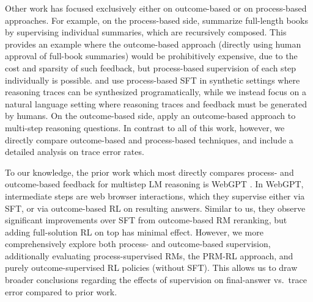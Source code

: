 \documentclass[11pt, a4paper, logo]{deepmind}
\newcommand{\prmrl}{PRM-RL}
\begin{document}
{Other work has focused exclusively either on outcome-based or on process-based approaches.  For example, on the process-based side, 
\citet{wu2021recursively} summarize full-length books by supervising individual summaries, which are recursively composed.
This provides an example where the outcome-based approach (directly using human approval of full-book summaries) would be prohibitively expensive, due to the cost and sparsity of such feedback, but process-based supervision of each step individually is possible.
\cite{creswell2022selection} and \cite{nye2021show} use process-based SFT in synthetic settings where reasoning traces can be synthesized programatically, while we instead focus on a natural language setting where reasoning traces and feedback must be generated by humans.
On the outcome-based side, \citet{zelikman2022star} apply an outcome-based approach to multi-step reasoning questions.  In contrast to all of this work, however, we directly compare outcome-based and process-based techniques, and include a detailed analysis on trace error rates.


To our knowledge, the prior work which most directly compares process- and outcome-based feedback for multistep LM reasoning is WebGPT \citep{nakano2021webgpt}.
In WebGPT, intermediate steps are web browser interactions, which they supervise either via SFT, or via outcome-based RL on resulting answers.
Similar to us, they observe significant improvements over SFT from outcome-based RM reranking, but adding full-solution RL on top has minimal effect.
However, we more comprehensively explore both process- and outcome-based supervision, additionally evaluating process-supervised RMs, the \prmrl{} approach, and purely outcome-supervised RL policies (without SFT).
This allows us to draw broader conclusions regarding the effects of supervision on final-answer vs.\ trace error compared to prior work.

















}
\end{document}
